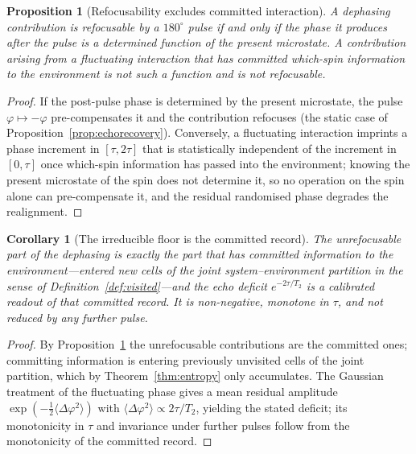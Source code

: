 \documentclass[11pt,a4paper]{article}
\theoremstyle{thmstyle}
\newtheorem{proposition}[theorem]{Proposition}
\newtheorem{corollary}[theorem]{Corollary}
\theoremstyle{definition}
\theoremstyle{remark}
\newcommand{\phase}{\varphi}
\begin{document}
\begin{proposition}[Refocusability excludes committed interaction]
\label{prop:refocus}
A dephasing contribution is refocusable by a $180^\circ$ pulse if and only
if the phase it produces after the pulse is a determined function of the
present microstate. A contribution arising from a fluctuating interaction
that has committed which-spin information to the environment is not such a
function and is not refocusable.
\end{proposition}

\begin{proof}
If the post-pulse phase is determined by the present microstate, the pulse
$\phase\mapsto-\phase$ pre-compensates it and the contribution refocuses
(the static case of Proposition~\ref{prop:echorecovery}). Conversely, a
fluctuating interaction imprints a phase increment in $[\tau,2\tau]$ that is
statistically independent of the increment in $[0,\tau]$ once which-spin
information has passed into the environment; knowing the present microstate
of the spin does not determine it, so no operation on the spin alone can
pre-compensate it, and the residual randomised phase degrades the
realignment.
\end{proof}

\begin{corollary}[The irreducible floor is the committed record]
\label{cor:floor}
The unrefocusable part of the dephasing is exactly the part that has
committed information to the environment---entered new cells of the joint
system--environment partition in the sense of
Definition~\ref{def:visited}---and the echo deficit $e^{-2\tau/T_2}$ is a
calibrated readout of that committed record. It is non-negative, monotone
in $\tau$, and not reduced by any further pulse.
\end{corollary}

\begin{proof}
By Proposition~\ref{prop:refocus} the unrefocusable contributions are the
committed ones; committing information is entering previously unvisited
cells of the joint partition, which by Theorem~\ref{thm:entropy} only
accumulates. The Gaussian treatment of the fluctuating phase gives a mean
residual amplitude $\exp(-\tfrac12\langle\Delta\phase^2\rangle)$ with
$\langle\Delta\phase^2\rangle\propto 2\tau/T_2$, yielding the stated
deficit; its monotonicity in $\tau$ and invariance under further pulses
follow from the monotonicity of the committed record.
\end{proof}
\end{document}
